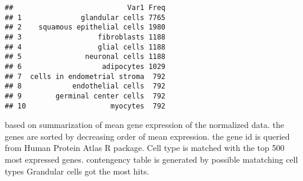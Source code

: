 \documentclass[]{article}
\begin{document}
\begin{verbatim}
##                           Var1 Freq
## 1              glandular cells 7765
## 2    squamous epithelial cells 1980
## 3                  fibroblasts 1188
## 4                  glial cells 1188
## 5               neuronal cells 1188
## 6                   adipocytes 1029
## 7  cells in endometrial stroma  792
## 8            endothelial cells  792
## 9        germinal center cells  792
## 10                    myocytes  792
\end{verbatim}

based on summarization of mean gene expression of the normalized data.
the genes are sorted by decreasing order of mean expression. the gene id
is queried from Human Protein Atlas R package. Cell type is matched with
the top 500 most expressed genes. contengency table is generated by
possible matatching cell types Grandular cells got the most hits.
\end{document}
